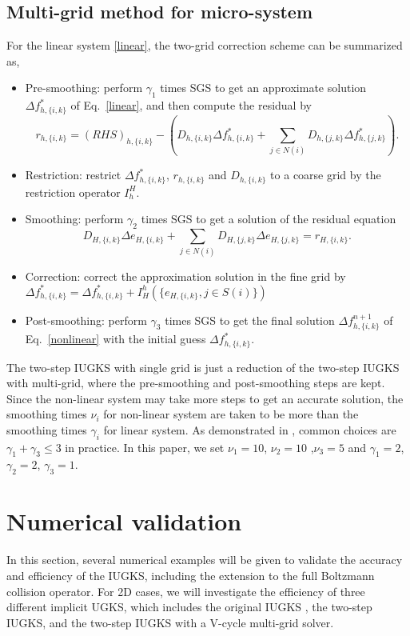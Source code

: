\documentclass[3p,12pt]{elsarticle}
\begin{document}
	\subsection{Multi-grid method for micro-system}
	For the linear system \eqref{linear}, the two-grid correction scheme can be summarized as,
	\begin{itemize}
		\item Pre-smoothing: perform $\gamma_1$ times SGS to get an approximate solution ${\Delta f}_{h,\{i,k\}}^*$ of Eq.~\eqref{linear}, and then compute the residual by $${r}_{h,\{i,k\}} =  (RHS)_{h,\{i,k\}} - \left( D_{h,\{i,k\}} \Delta f_{h,\{i,k\}}^{*} + \sum_{j \in {N(i)}}D_{h,\{j,k\}}\Delta f_{h,\{j,k\}}^{*}\right).$$
		\item Restriction: restrict ${\Delta f}_{h,\{i,k\}}^*$, ${r}_{h,\{i,k\}}$ and $D_{h,\{i,k\}}$ to a coarse grid by the restriction operator $I_{h}^{H}$.
		\item Smoothing: perform $\gamma_2$ times SGS to get a solution of the residual equation $$D_{H,\{i,k\}} \Delta e_{H,\{i,k\}} + \sum_{j \in {N(i)}}D_{H,\{j,k\}} \Delta e_{H,\{j,k\}} = r_{H,\{i,k\}}.$$
		\item Correction: correct the approximation solution in the fine grid by $\Delta f_{h,\{i,k\}}^{*}= \Delta f_{h,\{i,k\}}^{*} + I_{H}^{h}(\{ {e}_{H,\{i,k\}}, j \in S(i)\})$
		\item Post-smoothing: perform $\gamma_3$ times SGS to get the final solution $\Delta f_{h,\{i,k\}}^{n+1}$ of Eq.~\eqref{nonlinear} with the initial guess $\Delta f_{h,\{i,k\}}^{*}$.
	\end{itemize}
	The two-step IUGKS with single grid is just a reduction of the two-step IUGKS with multi-grid, where the pre-smoothing and post-smoothing steps are kept. Since the non-linear system may take more steps to get an accurate solution, the smoothing times $\nu_i$ for non-linear system are taken to be more than the smoothing times $\gamma_i$ for linear system. As demonstrated in \cite{trottenberg2000multigrid}, common choices are $\gamma_1 + \gamma_3 \leq 3$ in practice. In this paper, we set $\nu_1 = 10$, $\nu_2 = 10$ ,$\nu_3 = 5$ and $\gamma_1 = 2$, $\gamma_2 = 2$, $\gamma_3 = 1$.
	
	\section{Numerical validation}\label{example}
	
	In this section, several numerical examples will be given to validate the accuracy and efficiency of the IUGKS, including the extension to the full Boltzmann collision operator.
	For 2D cases, we will investigate the efficiency of three different implicit UGKS, which includes the original IUGKS \cite{zhu2016implicit}, the two-step IUGKS, and the two-step IUGKS with a V-cycle multi-grid solver.
\end{document}
